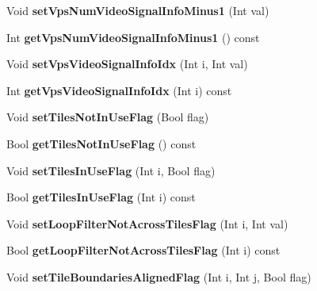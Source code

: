 \begin{DoxyCompactItemize}
Void {\bfseries set\+Vps\+Num\+Video\+Signal\+Info\+Minus1} (Int val)
\item 
\mbox{\label{class_t_com_v_p_s_v_u_i_a654cd74578231d74d2ca9f8e0016b4c7}} 
Int {\bfseries get\+Vps\+Num\+Video\+Signal\+Info\+Minus1} () const
\item 
\mbox{\label{class_t_com_v_p_s_v_u_i_a46ae31b68163419575b90fed47fdfcab}} 
Void {\bfseries set\+Vps\+Video\+Signal\+Info\+Idx} (Int i, Int val)
\item 
\mbox{\label{class_t_com_v_p_s_v_u_i_a5dd0201632ada0fce47545c01f494389}} 
Int {\bfseries get\+Vps\+Video\+Signal\+Info\+Idx} (Int i) const
\item 
\mbox{\label{class_t_com_v_p_s_v_u_i_ab96420fb79c85a1c4766da52b0e3809f}} 
Void {\bfseries set\+Tiles\+Not\+In\+Use\+Flag} (Bool flag)
\item 
\mbox{\label{class_t_com_v_p_s_v_u_i_a62eaed0e6088ac0d33f91b1b554b4dc0}} 
Bool {\bfseries get\+Tiles\+Not\+In\+Use\+Flag} () const
\item 
\mbox{\label{class_t_com_v_p_s_v_u_i_a01a37f64b61982588d9750045e9f4d5d}} 
Void {\bfseries set\+Tiles\+In\+Use\+Flag} (Int i, Bool flag)
\item 
\mbox{\label{class_t_com_v_p_s_v_u_i_a248404844c158e0e9bbcded3374bdcf4}} 
Bool {\bfseries get\+Tiles\+In\+Use\+Flag} (Int i) const
\item 
\mbox{\label{class_t_com_v_p_s_v_u_i_a13c116518e9a67e711f5f8a5ee992c7c}} 
Void {\bfseries set\+Loop\+Filter\+Not\+Across\+Tiles\+Flag} (Int i, Int val)
\item 
\mbox{\label{class_t_com_v_p_s_v_u_i_abf0b696b419e53408664c6cad5dd8af9}} 
Bool {\bfseries get\+Loop\+Filter\+Not\+Across\+Tiles\+Flag} (Int i) const
\item 
\mbox{\label{class_t_com_v_p_s_v_u_i_a5f0db3b247139a433a4d25f059cbe93f}} 
Void {\bfseries set\+Tile\+Boundaries\+Aligned\+Flag} (Int i, Int j, Bool flag)

\end{DoxyCompactItemize}
